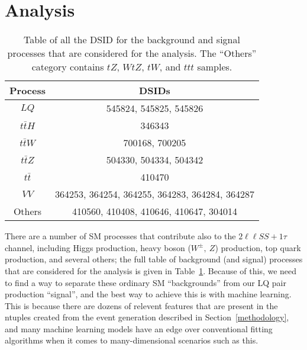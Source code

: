 \section{Analysis}
    \renewcommand{\arraystretch}{1.2}
    \begin{table}[t!]
        \centering
        \begin{tabular}{c|c}
            Process & DSIDs \\ \hline
            $LQ$        & 545824, 545825, 545826 \\ \hline
            $t\bar{t}H$ & 346343 \\ \hline
            $t\bar{t}W$ & 700168, 700205 \\ \hline
            $t\bar{t}Z$ & 504330, 504334, 504342 \\ \hline
            $t\bar{t}$  & 410470 \\ \hline 
            $VV$        & 364253, 364254, 364255, 364283, 364284, 364287 \\ \hline 
            Others      & 410560, 410408, 410646, 410647, 304014 \\
        \end{tabular}
        \caption{Table of all the DSID for the background and signal processes that are considered for the analysis. The ``Others'' category contains $tZ$, $WtZ$, $tW$, and $ttt$ samples.}
        \label{signalAndBackgroundDSIDs}
    \end{table}
    \renewcommand{\arraystretch}{1}

    There are a number of SM processes that contribute also to the $2\ell\ell SS + 1\tau$ channel, including Higgs production, heavy boson ($W^{\pm},\ Z$) production, top quark production, and several others; the full table of background (and signal) processes that are considered for the analysis is given in Table~\ref{signalAndBackgroundDSIDs}. Because of this, we need to find a way to separate these ordinary SM ``backgrounds'' from our LQ pair production ``signal'', and the best way to achieve this is with machine learning. This is because there are dozens of relevent features that are present in the ntuples created from the event generation described in Section~\ref{methodology}, and many machine learning models have an edge over conventional fitting algorithms when it comes to many-dimensional scenarios such as this.


    